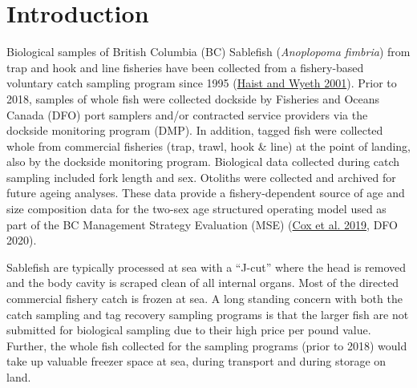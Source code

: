 \documentclass[12pt]{article}\usepackage[]{graphicx}\usepackage[]{color}
\begin{document}

\frontmatter


\renewcommand{\headrulewidth}{0.5pt}  %
\renewcommand{\footrulewidth}{0.5pt}  %

\newcommand{\lt}{\ensuremath <}
\newcommand{\gt}{\ensuremath >}

\newlength{\cslhangindent}
\setlength{\cslhangindent}{1.5em}
\newenvironment{cslreferences}%
  {}%
  {\par}

\hypertarget{introduction}{%
\section{Introduction}\label{introduction}}

Biological samples of British Columbia (BC) Sablefish (\emph{Anoplopoma fimbria}) from trap and hook and line fisheries have been collected from a fishery-based voluntary catch sampling program since 1995 (\protect\hyperlink{ref-Haist2001}{Haist and Wyeth 2001}). Prior to 2018, samples of whole fish were collected dockside by Fisheries and Oceans Canada (DFO) port samplers and/or contracted service providers via the dockside monitoring program (DMP). In addition, tagged fish were collected whole from commercial fisheries (trap, trawl, hook \& line) at the point of landing, also by the dockside monitoring program. Biological data collected during catch sampling included fork length and sex. Otoliths were collected and archived for future ageing analyses. These data provide a fishery-dependent source of age and size composition data for the two-sex age structured operating model used as part of the BC Management Strategy Evaluation (MSE) (\protect\hyperlink{ref-Cox2019}{Cox et al. 2019}, DFO 2020).

Sablefish are typically processed at sea with a ``J-cut'' where the head is removed and the body cavity is scraped clean of all internal organs. Most of the directed commercial fishery catch is frozen at sea. A long standing concern with both the catch sampling and tag recovery sampling programs is that the larger fish are not submitted for biological sampling due to their high price per pound value. Further, the whole fish collected for the sampling programs (prior to 2018) would take up valuable freezer space at sea, during transport and during storage on land.
\end{document}
